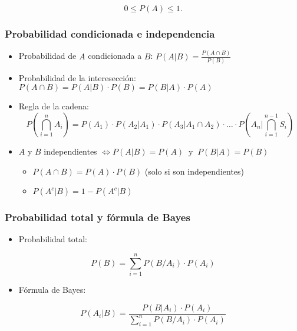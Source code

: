 \documentclass[
]{article}
\providecommand{\tightlist}{%
  \setlength{\itemsep}{0pt}\setlength{\parskip}{0pt}}
\begin{document}
\[ \boxed{0 \leq P(A) \leq 1}.\]

\hypertarget{probabilidad-condicionada-e-independencia}{%
\subsubsection{Probabilidad condicionada e
independencia}\label{probabilidad-condicionada-e-independencia}}

\begin{itemize}
\tightlist
\item
  Probabilidad de \(A\) condicionada a \(B\):
  \({P(A | B)=\frac{P(A \cap B)}{P(B)}}\)
\item
  Probabilidad de la interesección:
  \(\boxed{P(A\cap B)=P(A|B)\cdot P(B)=P(B|A)\cdot P(A)}\)
\item
  Regla de la cadena:
  \[P\left( \bigcap\limits_{i=1}^{n} A_i \right) = P(A_1)\cdot P(A_2|A_1)\cdot P(A_3|A_1 \cap A_2)\cdot\ldots\cdot P\left(A_n | \bigcap\limits_{i=1}^{n-1} S_i \right)\]
\item
  \(A\) y \(B\) independientes
  \(\iff P(A|B) = P(A)\;\; \text{y}\;\; P(B|A) = P(B)\)

  \begin{itemize}
  \tightlist
  \item
    \(\boxed{P(A\cap B)=P(A)\cdot P(B)}\) (solo si son independientes)
  \item
    \(P(A^c|B) = 1- P(A^c|B)\)
  \end{itemize}
\end{itemize}

\hypertarget{probabilidad-total-y-fuxf3rmula-de-bayes}{%
\subsubsection{Probabilidad total y fórmula de
Bayes}\label{probabilidad-total-y-fuxf3rmula-de-bayes}}

\begin{itemize}
\tightlist
\item
  Probabilidad total:
\end{itemize}

\[\boxed{P(B)=\sum\limits_{i=1}^{n} P(B/A_i)\cdot P(A_i)}\]

\begin{itemize}
\tightlist
\item
  Fórmula de Bayes:
\end{itemize}

\[\boxed{P(A_i|B)=\frac{P(B|A_i)\cdot P(A_i)}{\sum\limits_{i=1}^{n} P(B/A_i)\cdot P(A_i)}}\]
\end{document}
